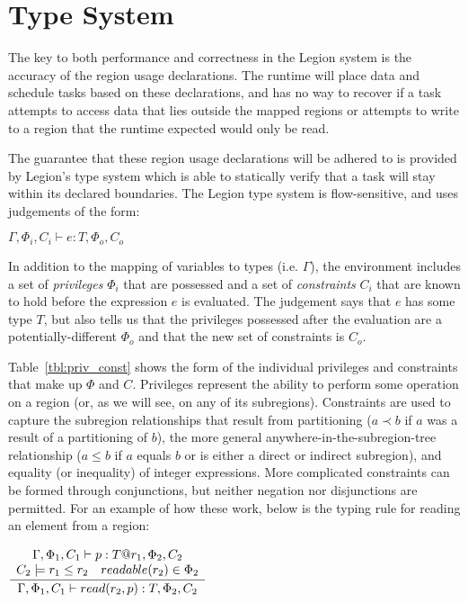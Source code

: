 \section{Type System}
\label{sec:type}

The key to both performance and correctness in the Legion system is the
accuracy of the region usage declarations.  The runtime will place data and
schedule tasks based on these declarations, and has no way to recover if a 
task attempts to access data that lies outside the mapped regions or attempts
to write to a region that the runtime expected would only be read.

The guarantee that these region usage declarations will be adhered to is
provided by Legion's type system which is able to statically verify that a 
task will stay within its declared boundaries.  The Legion type system is
flow-sensitive, and uses judgements of the form:

\begin{center}
$\Gamma, \Phi_i, C_i \vdash e : T, \Phi_o, C_o$
\end{center}

In addition to the mapping of variables to types (i.e. $\Gamma$), the
environment includes a set of \emph{privileges} $\Phi_i$ that are possessed
and a set of \emph{constraints} $C_i$ that are known to hold before the 
expression $e$ is evaluated.  The judgement says that $e$ has some type $T$,
but also tells us that the privileges possessed after the
evaluation are a potentially-different $\Phi_o$ and that the new set of 
constraints is $C_o$.

Table~\ref{tbl:priv_const} shows the form of the individual privileges and
constraints that make up $\Phi$ and $C$.  Privileges represent the ability to
perform some operation on a region (or, as we will see, on any of its
subregions).  Constraints are used to capture the subregion relationships that
result from partitioning ($a \prec b$ if $a$ was a result of a partitioning of
$b$), the more general anywhere-in-the-subregion-tree relationship ($a \le b$ if $a$ equals $b$ or is either a direct or indirect subregion), and equality (or
inequality) of integer expressions.  More complicated constraints can be formed
through conjunctions, but neither negation nor disjunctions are permitted.  For
an example of how these work, below is the typing rule for reading an element
from a region:

\begin{center}
{\small
\begin{math}
\infrule{
\begin{array}{lc}
  \multicolumn{2}{c}{\Gamma, \Phi_1, C_1 \vdash p : T@r_1, \Phi_2, C_2} \\
  C_2 \models r_1 \le r_2 & readable(r_2) \in \Phi_2
\end{array}
}
{
  \Gamma, \Phi_1, C_1 \vdash read(r_2, p) : T, \Phi_2, C_2
}
\end{math} 
}
\end{center}

